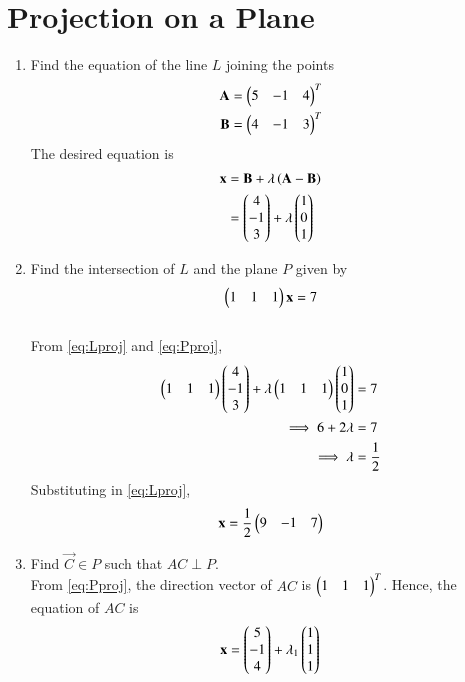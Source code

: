 \documentclass[journal,12pt,twocolumn]{IEEEtran}
\renewcommand\thesection{\arabic{section}}
\begin{document}
\section{Projection on a Plane}
\begin{enumerate}[label=\thesection.\arabic*
,ref=\thesection.\theenumi]
%
\item Find the equation of the line $L$ joining the points 
\begin{align}
\mathbf{A}=\begin{pmatrix}5 & -1 &4\end{pmatrix}^T
\\
\mathbf{B}=\begin{pmatrix}4 & -1 & 3\end{pmatrix}^T
\end{align}
\solution The desired equation is
\begin{align}
\mathbf{x} &= \mathbf{B} + \lambda\left(\mathbf{A}-\mathbf{B}\right)
\\
&= \begin{pmatrix}4 \\ -1 \\ 3\end{pmatrix} + \lambda \begin{pmatrix}1 \\ 0 \\ 1\end{pmatrix}
\label{eq:Lproj}
\end{align}
\item Find the intersection of $L$ and the plane $P$ given by
\begin{equation}
\begin{pmatrix}1 & 1 & 1\end{pmatrix}\mathbf{x} = 7
\label{eq:Pproj}
\end{equation}
\\
\solution From \eqref{eq:Lproj} and \eqref{eq:Pproj},
\begin{align}
 \begin{pmatrix}1 & 1 & 1\end{pmatrix}\begin{pmatrix}4 \\ -1 \\ 3\end{pmatrix} + \lambda \begin{pmatrix}1 & 1 & 1\end{pmatrix}
\begin{pmatrix}1 \\ 0 \\ 1\end{pmatrix} &= 7
\\
\implies 6 + 2\lambda &= 7
\\
\implies \lambda &= \frac{1}{2}
\end{align}
%
Substituting in \eqref{eq:Lproj},
\begin{equation}
\mathbf{x} = \frac{1}{2}\begin{pmatrix}9 & -1 & 7\end{pmatrix}
\end{equation}
\item Find $\vec{C} \in P$  such that $AC \perp P$.  
\\
\solution From \eqref{eq:Pproj}, the direction vector of $AC$ is $\begin{pmatrix}1 & 1 & 1\end{pmatrix}^T$.  Hence, the equation of 
$AC$ is
\begin{equation}
\vec{x} = \myvec{5 \\ -1 \\ 4} + \lambda_1  \myvec{1 \\ 1 \\ 1}

\end{equation}
\end{enumerate}
\end{document}
